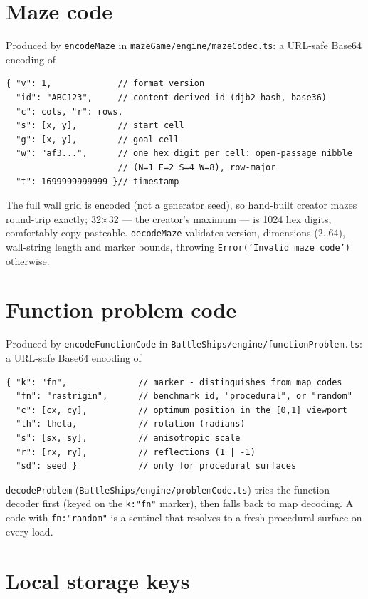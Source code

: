 \documentclass[11pt,a4paper]{report}
\newcommand{\srcfile}[1]{\texttt{\small #1}}   %
\newcommand{\ts}[1]{\texttt{#1}}               %
\begin{document}
\section{Maze code}

Produced by \ts{encodeMaze} in \srcfile{mazeGame/engine/mazeCodec.ts}: a
URL-safe Base64 encoding of

\begin{lstlisting}
{ "v": 1,             // format version
  "id": "ABC123",     // content-derived id (djb2 hash, base36)
  "c": cols, "r": rows,
  "s": [x, y],        // start cell
  "g": [x, y],        // goal cell
  "w": "af3...",      // one hex digit per cell: open-passage nibble
                      // (N=1 E=2 S=4 W=8), row-major
  "t": 1699999999999 }// timestamp
\end{lstlisting}

The full wall grid is encoded (not a generator seed), so hand-built
creator mazes round-trip exactly; 32$\times$32 --- the creator's maximum
--- is 1024 hex digits, comfortably copy-pasteable. \ts{decodeMaze}
validates version, dimensions (2..64), wall-string length and marker
bounds, throwing \ts{Error('Invalid maze code')} otherwise.

\section{Function problem code}

Produced by \ts{encodeFunctionCode} in
\srcfile{BattleShips/engine/functionProblem.ts}: a URL-safe Base64
encoding of

\begin{lstlisting}
{ "k": "fn",              // marker - distinguishes from map codes
  "fn": "rastrigin",      // benchmark id, "procedural", or "random"
  "c": [cx, cy],          // optimum position in the [0,1] viewport
  "th": theta,            // rotation (radians)
  "s": [sx, sy],          // anisotropic scale
  "r": [rx, ry],          // reflections (1 | -1)
  "sd": seed }            // only for procedural surfaces
\end{lstlisting}

\ts{decodeProblem} (\srcfile{BattleShips/engine/problemCode.ts}) tries the
function decoder first (keyed on the \ts{k:"fn"} marker), then falls back
to map decoding. A code with \ts{fn:"random"} is a sentinel that resolves
to a fresh procedural surface on every load.

\section{Local storage keys}
\end{document}
